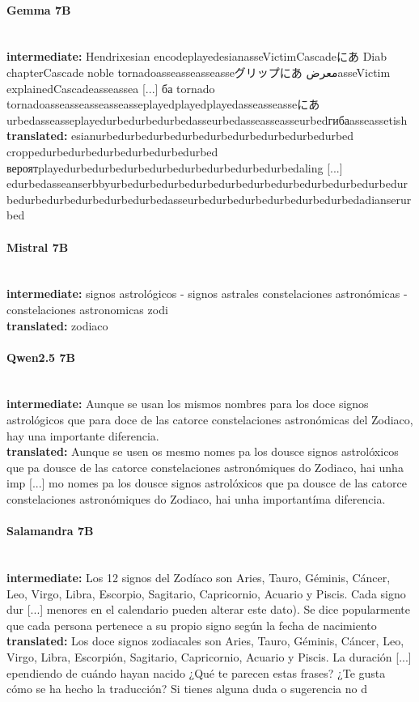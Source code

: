 \paragraph{Gemma 7B}~\\
\textbf{intermediate:} Hendrixesian encodeplayedesianasseVictimCascadeにあ Diab chapterCascade noble tornadoasseasseasseasseグリップにあ معرضasseVictim explainedCascadeasseassea [...] ба tornado tornadoasseasseasseasseasseplayedplayedplayedasseasseasseにあurbedasseasseplayedurbedurbedurbedasseurbedasseasseasseurbedгибаasseassetish\\
\textbf{translated:} esianurbedurbedurbedurbedurbedurbedurbedurbedurbed croppedurbedurbedurbedurbedurbedurbed вероятplayedurbedurbedurbedurbedurbedurbedurbedurbedaling [...] edurbedasseanserbbyurbedurbedurbedurbedurbedurbedurbedurbedurbedurbedurbedurbedurbedurbedurbedurbedasseurbedurbedurbedurbedurbedurbedadianserurbed\\

\paragraph{Mistral 7B}~\\
\textbf{intermediate:} signos astrológicos - signos astrales constelaciones astronómicas - constelaciones astronomicas zodi\\
\textbf{translated:} zodiaco\\

\paragraph{Qwen2.5 7B}~\\
\textbf{intermediate:} Aunque se usan los mismos nombres para los doce signos astrológicos que para doce de las catorce constelaciones astronómicas del Zodiaco, hay una importante diferencia.\\
\textbf{translated:} Aunque se usen os mesmo nomes pa los dousce signos astrolóxicos que pa dousce de las catorce constelaciones astronómiques do Zodiaco, hai unha imp [...] mo nomes pa los dousce signos astrolóxicos que pa dousce de las catorce constelaciones astronómiques do Zodiaco, hai unha importantíma diferencia.\\

\paragraph{Salamandra 7B}~\\
\textbf{intermediate:} Los 12 signos del Zodíaco son Aries, Tauro, Géminis, Cáncer, Leo, Virgo, Libra, Escorpio, Sagitario, Capricornio, Acuario y Piscis. Cada signo dur [...] menores en el calendario pueden alterar este dato). Se dice popularmente que cada persona pertenece a su propio signo según la fecha de nacimiento\\
\textbf{translated:} Los doce signos zodiacales son Aries, Tauro, Géminis, Cáncer, Leo, Virgo, Libra, Escorpión, Sagitario, Capricornio, Acuario y Piscis. La duración  [...] ependiendo de cuándo hayan nacido  ¿Qué te parecen estas frases? ¿Te gusta cómo se ha hecho la traducción? Si tienes alguna duda o sugerencia no d\\

